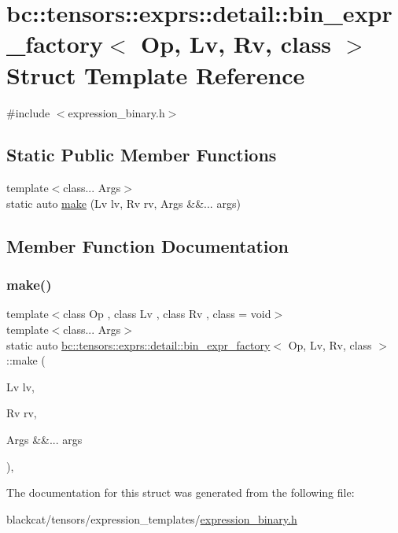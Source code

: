 \hypertarget{structbc_1_1tensors_1_1exprs_1_1detail_1_1bin__expr__factory}{}\section{bc\+:\+:tensors\+:\+:exprs\+:\+:detail\+:\+:bin\+\_\+expr\+\_\+factory$<$ Op, Lv, Rv, class $>$ Struct Template Reference}
\label{structbc_1_1tensors_1_1exprs_1_1detail_1_1bin__expr__factory}


{\ttfamily \#include $<$expression\+\_\+binary.\+h$>$}

\subsection*{Static Public Member Functions}
\begin{DoxyCompactItemize}
\item 
{\footnotesize template$<$class... Args$>$ }\\static auto \hyperlink{structbc_1_1tensors_1_1exprs_1_1detail_1_1bin__expr__factory_a64c4b332e8688677ff904c7fb7d6e7a1}{make} (Lv lv, Rv rv, Args \&\&... args)
\end{DoxyCompactItemize}


\subsection{Member Function Documentation}
\mbox{\label{structbc_1_1tensors_1_1exprs_1_1detail_1_1bin__expr__factory_a64c4b332e8688677ff904c7fb7d6e7a1}} 
\subsubsection{\texorpdfstring{make()}{make()}}
{\footnotesize\ttfamily template$<$class Op , class Lv , class Rv , class  = void$>$ \\
template$<$class... Args$>$ \\
static auto \hyperlink{structbc_1_1tensors_1_1exprs_1_1detail_1_1bin__expr__factory}{bc\+::tensors\+::exprs\+::detail\+::bin\+\_\+expr\+\_\+factory}$<$ Op, Lv, Rv, class $>$\+::make (\begin{DoxyParamCaption}\item[{Lv}]{lv,  }\item[{Rv}]{rv,  }\item[{Args \&\&...}]{args }\end{DoxyParamCaption})\hspace{0.3cm}{\ttfamily [inline]}, {\ttfamily [static]}}



The documentation for this struct was generated from the following file\+:\begin{DoxyCompactItemize}
\item 
blackcat/tensors/expression\+\_\+templates/\hyperlink{expression__binary_8h}{expression\+\_\+binary.\+h}\end{DoxyCompactItemize}
